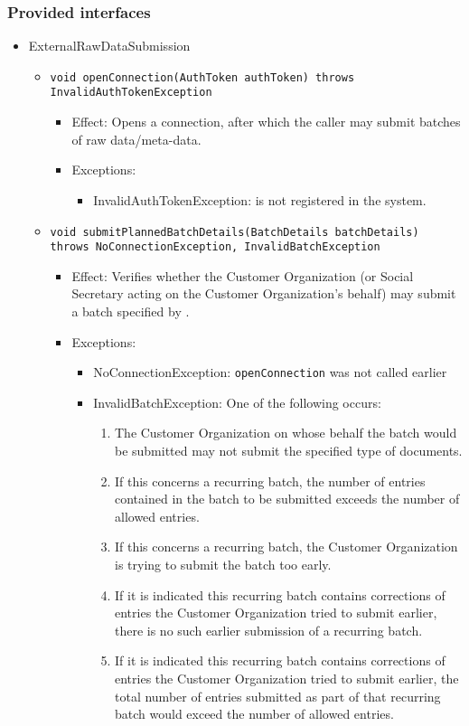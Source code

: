 \subsubsection*{Provided interfaces}
\begin{itemize}
	\item ExternalRawDataSubmission
	\begin{itemize}
		\item \texttt{void openConnection(AuthToken authToken) throws InvalidAuthTokenException}
		\begin{itemize}
			\item Effect: Opens a connection, after which the caller may submit batches of raw data/meta-data.
			\item Exceptions:
			\begin{itemize}
				\item InvalidAuthTokenException:  is not registered in the system.
			\end{itemize}
		\end{itemize}
		
		\item \texttt{void submitPlannedBatchDetails(BatchDetails batchDetails) throws NoConnectionException, InvalidBatchException}
		\begin{itemize}
			\item Effect: Verifies whether the Customer Organization (or Social Secretary acting on the Customer Organization's behalf) may submit a batch specified by .
			\item Exceptions:
			\begin{itemize}
				\item NoConnectionException: \texttt{openConnection} was not called earlier
				\item InvalidBatchException: One of the following occurs:
				\begin{enumerate}
					\item The Customer Organization on whose behalf the batch would be submitted may not submit the specified type of documents.
					\item If this concerns a recurring batch, the number of entries contained in the batch to be submitted exceeds the number of allowed entries.
					\item If this concerns a recurring batch, the Customer Organization is trying to submit the batch too early.
					\item If it is indicated this recurring batch contains corrections of entries the Customer Organization tried to submit earlier, there is no such earlier submission of a recurring batch.
					\item If it is indicated this recurring batch contains corrections of entries the Customer Organization tried to submit earlier, the total number of entries submitted as part of that recurring batch would exceed the number of allowed entries.
				\end{enumerate}
			\end{itemize}
		\end{itemize}
		

\end{itemize}
\end{itemize}
